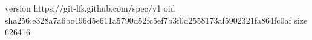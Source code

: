 version https://git-lfs.github.com/spec/v1
oid sha256:e328a7a6bc496d5e611a5790d52fc5ef7b3f0d2558173af5902321fa864fc0af
size 626416
